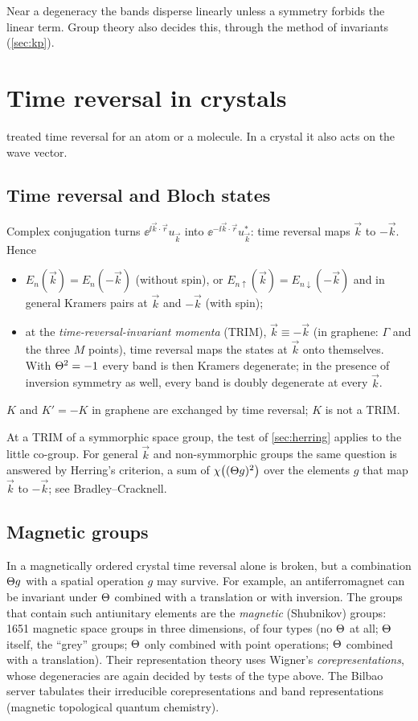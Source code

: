 Near a degeneracy the bands disperse linearly unless a symmetry forbids the linear
term. Group theory also decides this, through the method of invariants
(\cref{sec:kp}).

\section{Time reversal in crystals\beyondmark}\label{sec:TRcrystal}

 treated time reversal for an atom or a molecule. In a crystal it also
acts on the wave vector.

\subsection{Time reversal and Bloch states}
Complex conjugation turns $\ee^{\ii\vec{k}\cdot\vec{r}}u_{\vec{k}}$ into
$\ee^{-\ii\vec{k}\cdot\vec{r}}u^{*}_{\vec{k}}$: time reversal maps $\vec{k}$ to $-\vec{k}$.
Hence
\begin{itemize}
\item $E_n(\vec{k})=E_n(-\vec{k})$ (without spin), or $E_{n\uparrow}(\vec{k})=E_{n\downarrow}(-\vec{k})$
      and in general Kramers pairs at $\vec{k}$ and $-\vec{k}$ (with spin);
\item at the \emph{time-reversal-invariant momenta} (TRIM), $\vec{k}\equiv-\vec{k}$ (in
      graphene: $\Gamma$ and the three $M$ points), time reversal maps the states at
      $\vec{k}$ onto themselves. With $\Theta^2=-1$ every band is then Kramers degenerate;
      in the presence of inversion symmetry as well, every band is doubly degenerate
      at every $\vec{k}$.
\end{itemize}
$K$ and $K'=-K$ in graphene are exchanged by time reversal; $K$ is not a TRIM.

At a TRIM of a symmorphic space group, the test of \cref{sec:herring} applies to the
little co-group. For general $\vec{k}$ and non-symmorphic groups the same question is
answered by Herring's criterion, a sum of $\chi\bigl((\Theta g)^2\bigr)$ over the elements
$g$ that map $\vec{k}$ to $-\vec{k}$; see Bradley--Cracknell.

\subsection{Magnetic groups}\label{sec:magnetic}
In a magnetically ordered crystal time reversal alone is broken, but a combination
$\Theta g$ with a spatial operation $g$ may survive. For example, an antiferromagnet can be
invariant under $\Theta$ combined with a translation or with inversion. The groups that
contain such antiunitary elements are the \emph{magnetic} (Shubnikov) groups: 1651
magnetic space groups in three dimensions, of four types (no $\Theta$ at all; $\Theta$ itself,
the ``grey'' groups; $\Theta$ only combined with point operations; $\Theta$ combined with a
translation). Their representation theory uses Wigner's \emph{corepresentations}, whose
degeneracies are again decided by tests of the type above. The Bilbao server tabulates
their irreducible corepresentations and band representations (magnetic topological
quantum chemistry).

